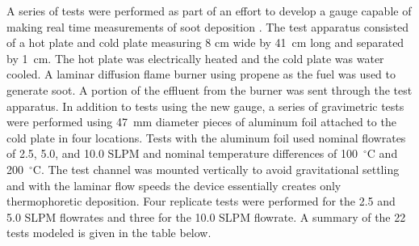 A series of tests were performed as part of an effort to develop a gauge capable of making real time measurements of soot deposition \cite{NIST_SDG}. The test apparatus consisted of a hot plate and cold plate measuring 8 cm wide by 41~cm long and separated by 1~cm. The hot plate was electrically heated and the cold plate was water cooled. A laminar diffusion flame burner using propene as the fuel was used to generate soot. A portion of the effluent from the burner was sent through the test apparatus. In addition to tests using the new gauge, a series of gravimetric tests were performed using 47~mm diameter pieces of aluminum foil attached to the cold plate in four locations. Tests with the aluminum foil used nominal flowrates of 2.5, 5.0, and 10.0 SLPM and nominal temperature differences of 100~$^{\circ}$C and 200~$^{\circ}$C. The test channel was mounted vertically to avoid gravitational settling and with the laminar flow speeds the device essentially creates only thermophoretic deposition. Four replicate tests were performed for the 2.5 and 5.0 SLPM flowrates and three for the 10.0 SLPM flowrate. A summary of the 22 tests modeled is given in the table below.


